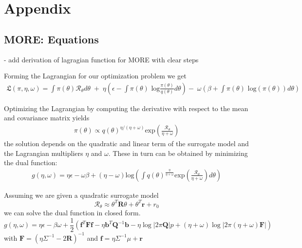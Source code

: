 
\chapter{Appendix}

\section{MORE: Equations}\label{more_appendix}
- add derivation of lagragian function for MORE with clear
steps

Forming the Lagrangian for our optimization problem we get
\begin{align*} \mathfrak{L}(\pi, \eta, \omega) = 
\int \pi(\theta) \mathcal{R}_{\theta} d\theta \; + \; 
\eta  \left(\epsilon - \int \pi(\theta) \text{ log}
 \frac{\pi(\theta)}{q(\theta)} d\theta\right)
 - \; \omega \left(\beta + \int \pi(\theta) \text{ log}(\pi(\theta)) d\theta\right)
\end{align*}

Optimizing the Lagrangian by computing the derivative with respect
to the mean and covariance matrix yields
\begin{align*}
\pi(\theta) \propto q(\theta)^{\eta/(\eta+\omega)} 
\text{exp}\left(\frac{\mathcal{R}_\theta}{\eta + \omega}\right)
\end{align*}
the solution depends on the quadratic and linear term
of the surrogate model and the
Lagrangian multipliers
$\eta$ and $\omega$. These in turn can be obtained by
minimizing the dual function:
\begin{align}
  \label{eq:dual}
  g(\eta,\omega) = \eta\epsilon - \omega\beta + (\eta - \omega) \text{log}
\left(\int q(\theta)^{\frac{\eta}{\eta + \omega}}
  \text{exp}\left(\frac{\mathcal{R}_\theta}{\eta + \omega}\right) d\theta \right)
\end{align}

Assuming we are given a quadratic surrogate model
$$ \mathcal{R}_\theta \approx \theta^T \mathbf{R} \theta + \theta^T \mathbf{r} + r_0 $$
we can solve the dual function in closed form.
$$ g(\eta, \omega) = \eta \epsilon - \beta \omega
+ \frac{1}{2} \left(\mathbf{f}^T \mathbf{F} \mathbf{f}
  - \eta \mathbf{b}^T \mathbf{Q}^{-1}
  \mathbf{b} - \eta \log |2\pi \mathbf{Q}|p
  + (\eta + \omega) \log |2\pi (\eta + \omega)
\mathbf{F}| \right) $$
with $\mathbf{F} = (\eta \Sigma^{-1} - 2 \mathbf{R})^{-1}$ and
$\mathbf{f} = \eta \Sigma^{-1} \mu + \mathbf{r}$


